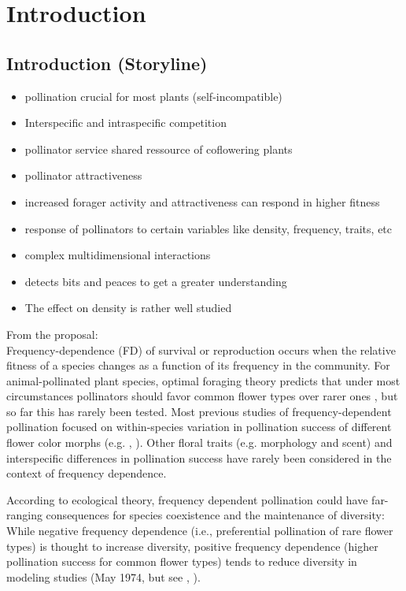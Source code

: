 \section{Introduction}

\subsection{Introduction (Storyline)}

\begin{itemize}

\item pollination crucial for most plants (self-incompatible)
\item Interspecific and intraspecific competition
\item pollinator service shared ressource of coflowering plants
\item pollinator attractiveness
\item increased forager activity and attractiveness can respond in higher fitness

\item response of pollinators to certain variables like density, frequency, traits, etc 
\item complex multidimensional interactions
\item detects bits and peaces to get a greater understanding
\item The effect on density is rather well studied
\end{itemize}


From the proposal:\\
Frequency-dependence (FD) of survival or reproduction occurs when the relative fitness of a species changes as a function of its frequency in the community. For animal-pollinated plant species, optimal foraging theory predicts that under most circumstances pollinators should favor common flower types over rarer ones \citep{kunin1996pollinator} , but so far this has rarely been tested. Most previous studies of frequency-dependent pollination focused on within-species variation in pollination success of different flower color morphs (e.g. \citealt{Eckhart2006frequency} , \citealt{smithson2001pollinator }). Other floral traits (e.g. morphology and scent) and interspecific differences in pollination success have rarely been considered in the context of frequency dependence.

According to ecological theory, frequency dependent pollination could have far-ranging consequences for species coexistence and the maintenance of diversity: While negative frequency dependence (i.e., preferential pollination of rare flower types) is thought to increase diversity, positive frequency dependence (higher pollination success for common flower types) tends to reduce diversity in modeling studies (May 1974, but see \citealt{bever1999dynamics}, \citealt{molofsky2002novel}).


